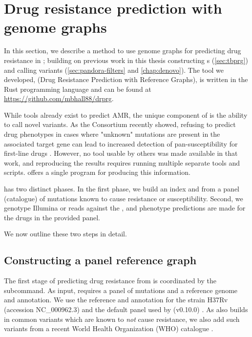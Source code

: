 \section{Drug resistance prediction with genome graphs}
\label{sec:drprg-methods}

In this section, we describe a method to use genome graphs for predicting drug resistance in \mtb{}; building on previous work in this thesis constructing \mtb{} \prg{}s (\autoref{sec:tbprg}) and calling variants (\autoref{sec:pandora-filters} and \autoref{chap:denovo}). The tool we developed, \drprg{} (Drug Resistance Prediction with Reference Graphs), is written in the Rust programming language and can be found at \url{https://github.com/mbhall88/drprg}.

While tools already exist to predict \mtb{} AMR, the unique component of \drprg{} is the ability to call novel variants. As the \cryptic{} Consortium recently showed, refusing to predict drug phenotypes in cases where "unknown" mutations are present in the associated target gene can lead to increased detection of pan-susceptibility for first-line drugs \cite{cryptic2018}. However, no tool usable by others was made available in that work, and reproducing the results requires running multiple separate tools and scripts. \drprg{} offers a single program for producing this information.

\drprg{} has two distinct phases. In the first phase, we build an index and \prg{} from a panel (catalogue) of mutations known to cause resistance or susceptibility. Second, we genotype Illumina or \ont{} reads against the \prg{}, and phenotype predictions are made for the drugs in the provided panel.

We now outline these two steps in detail.

\subsection{Constructing a panel reference graph}
\label{sec:drprg-index}

The first stage of predicting drug resistance from \drprg{} is coordinated by the  subcommand. As input,  requires a panel of mutations and a reference genome and annotation. We use the reference and annotation for the \mtb{} strain H37Rv (accession NC\_000962.3) and the default panel used by \mykrobe{} (v0.10.0) \cite{hunt2019}. As \mykrobe{} also builds in common variants which are known to \emph{not} cause resistance, we also add such variants from a recent World Health Organization (WHO) catalogue \cite{whopanel2021}. 

